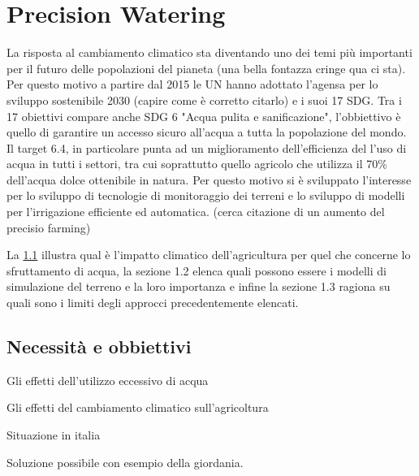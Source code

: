 \documentclass[12pt,a4paper,openright,twoside]{book}
\begin{document}
\chapter{Precision Watering}
%
%
La risposta al cambiamento climatico sta diventando uno dei temi più importanti per il futuro delle popolazioni del pianeta (una bella fontazza cringe qua ci sta). Per questo motivo a partire dal 2015 le \ac{UN} hanno adottato l'agensa per lo sviluppo sostenibile 2030 (capire come è corretto citarlo) e i suoi 17 \ac{SDG}. 
%
Tra i 17 obiettivi compare anche \ac{SDG} 6 "Acqua pulita e sanificazione", l'obbiettivo è quello di garantire un accesso sicuro all'acqua a tutta la popolazione del mondo\cite{SDG-6}. Il target 6.4, in particolare punta ad un miglioramento dell'efficienza del l'uso di acqua in tutti i settori\cite{SDG-6.4.1}, tra cui soprattutto quello agricolo che utilizza il 70\% dell'acqua dolce ottenibile in natura\cite{Odorico-Chiarelli-2020}. 
%
Per questo motivo si è sviluppato l'interesse per lo sviluppo di tecnologie di monitoraggio dei terreni e lo sviluppo di modelli per l'irrigazione efficiente ed automatica. (cerca citazione di un aumento del precisio farming)

La \cref{necessità e obbiettivi} illustra qual è l'impatto climatico dell'agricultura per quel che concerne lo sfruttamento di acqua, la sezione 1.2 elenca quali possono essere i modelli di simulazione del terreno e la loro importanza e infine la sezione 1.3 ragiona su quali sono i limiti degli approcci precedentemente elencati.

\section{Necessità e obbiettivi}
\label{necessità e obbiettivi}

Gli effetti dell'utilizzo eccessivo di acqua

Gli effetti del cambiamento climatico sull'agricoltura

Situazione in italia

Soluzione possibile con esempio della giordania.
\end{document}
